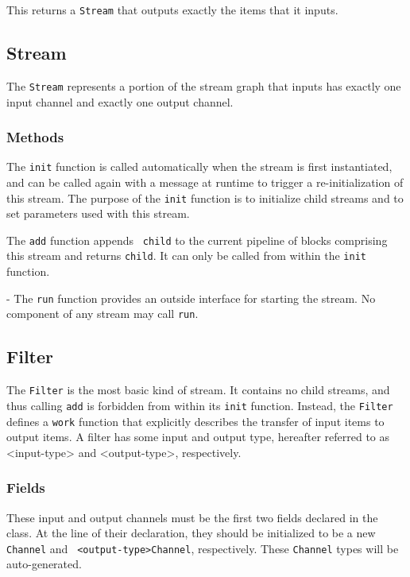  This returns a {\tt Stream} that outputs
exactly the items that it inputs.

\subsection{Stream}

The {\tt Stream} represents a portion of the stream graph that inputs
has exactly one input channel and exactly one output channel.

\subsubsection{Methods}

  The {\tt init} function is
called automatically when the stream is first instantiated, and can be
called again with a message at runtime to trigger a re-initialization
of this stream.  The purpose of the {\tt init} function is to
initialize child streams and to set parameters used with this stream.

  The {\tt add} function appends {\tt
child} to the current pipeline of blocks comprising this stream and
returns {\tt child}.  It can only be called from within the {\tt init}
function.

 - The {\tt run} function provides an outside
interface for starting the stream.  No component of any stream may
call {\tt run}.

\subsection{Filter}

The {\tt Filter} is the most basic kind of stream.  It contains no
child streams, and thus calling {\tt add} is forbidden from within its
{\tt init} function.  Instead, the {\tt Filter} defines a {\tt work}
function that explicitly describes the transfer of input items to
output items.  A filter has some input and output type, hereafter
referred to as <input-type> and <output-type>, respectively.

\subsubsection{Fields} 

These input and output channels must be the first two fields declared
in the class.  At the line of their declaration, they should be
initialized to be a new {\tt <input-type>Channel} and {\tt
<output-type>Channel}, respectively.  These {\tt Channel} types will
be auto-generated.

